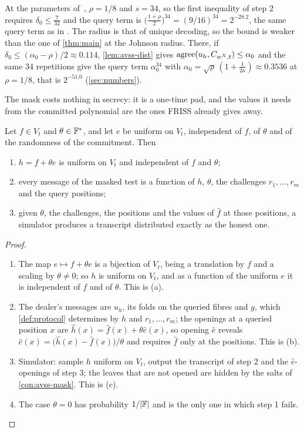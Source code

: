 At the parameters of~\cite[\S5]{PolyFRIM}, $\rho=1/8$ and $s=34$, so the first inequality of
step 2 requires $\delta_0\le\frac{7}{32}$ and the query term is
$\big(\frac{1+\rho}2\big)^{34}=(9/16)^{34}=2^{-28.2}$, the same query term as in
\cite[Thm.~3.1]{PolyFRIM}. The radius is that of unique decoding, so the bound is weaker than
the one of \cref{thm:main} at the Johnson radius. There, if $\delta_0\le(\alpha_0-\rho)/2\approx0.114$, \cref{lem:avss-dist} gives $\mathrm{agree}(u_h,C_{w^X,t})\le\alpha_0$ and the same $34$ repetitions give the
query term $\alpha_0^{34}$ with $\alpha_0=\sqrt\rho\,(1+\frac1{2\kappa})\approx0.3536$ at
$\rho=1/8$, that is $2^{-51.0}$ (\cref{sec:numbers}).

The mask costs nothing in secrecy: it is a one-time pad, and the values it needs from the
committed polynomial are the ones FRISS already gives away.

\begin{lemma}[Secrecy]\label{lem:avss-secret}
Let $f\in V_t$ and $\theta\in\mathbb{F}^*$, and let $e$ be uniform on $V_t$, independent of $f$, of
$\theta$ and of the randomness of the commitment. Then
\begin{enumerate}
\item[(a)] $h=f+\theta e$ is uniform on $V_t$ and independent of $f$ and $\theta$;
\item[(b)] every message of the masked test is a function of $h$, $\theta$, the challenges
$r_1,\dots,r_m$ and the query positions;
\item[(c)] given $\theta$, the challenges, the positions and the values of $\hat f$ at those
positions, a simulator produces a transcript distributed exactly as the honest one.
\end{enumerate}
\end{lemma}

\begin{proof}
\begin{enumerate}
\item The map $e\mapsto f+\theta e$ is a bijection of $V_t$, being a translation by $f$ and a
scaling by $\theta\ne0$; so $h$ is uniform on $V_t$, and as a function of the uniform $e$ it is
independent of $f$ and of $\theta$. This is (a).
\item The dealer's messages are $u_h$, its folds on the queried fibres and $g$, which
\cref{def:protocol} determines by $h$ and $r_1,\dots,r_m$; the openings at a queried position $x$
are $\hat h(x)=\hat f(x)+\theta\hat e(x)$, so opening $\hat e$ reveals
$\hat e(x)=\big(\hat h(x)-\hat f(x)\big)/\theta$ and requires $\hat f$ only at the positions.
This is (b).
\item Simulator: sample $h$ uniform on $V_t$, output the transcript of step 2 and the
$\hat e$-openings of step 3; the leaves that are not opened are hidden by the salts of
\cref{con:avss-mask}. This is (c).
\item The case $\theta=0$ has probability $1/|\mathbb{F}|$ and is the only one in which step 1 fails.
\end{enumerate}
\end{proof}


